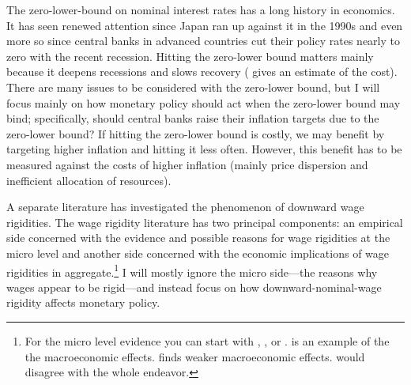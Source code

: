 \documentclass[12pt,a4paper]{scrartcl}            %
\begin{document}
The zero-lower-bound on nominal interest rates has a long history in economics. It has seen renewed attention since Japan ran up against it in the 1990s and even more so since central banks in advanced countries cut their policy rates nearly to zero with the recent recession.
Hitting the zero-lower bound matters mainly because it deepens recessions and slows recovery (\cite{williams_2009} gives an estimate of the cost).
There are many issues to be considered with the zero-lower bound, but I will focus mainly on how monetary policy should act when the zero-lower bound may bind;
specifically, should central banks raise their inflation targets due to the zero-lower bound?
If hitting the zero-lower bound is costly, we may benefit by targeting higher inflation and hitting it less often.
However, this benefit has to be measured against the costs of higher inflation (mainly price dispersion and inefficient allocation of resources).


A separate literature has investigated the phenomenon of downward wage rigidities.
The wage rigidity literature has two principal components: an empirical side concerned with the evidence and possible reasons for wage rigidities at the micro level and another side concerned with the economic implications of wage rigidities in aggregate.\footnote{For the micro level evidence you can start with \cite{dickens_et_al_2006}, \cite{akerlof_dickens_perry_1996}, or \cite{card_hyslop_1997}. \cite{erceg_henderson_levin_1999} is an example of the the macroeconomic effects.  \cite{elsby_2009} finds weaker macroeconomic effects. \cite{chari_kehoe_macgratten_2009} would disagree with the whole endeavor.}
I will mostly ignore the micro side---the reasons why wages appear to be rigid---and instead focus on how downward-nominal-wage rigidity affects monetary policy.
\end{document}
